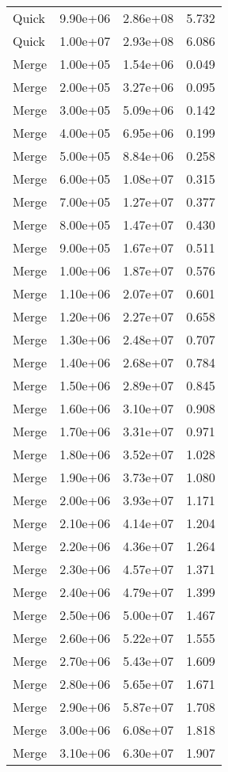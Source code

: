 \begin{table}
\begin{tabular}{llll}
Quick & 9.90e+06 & 2.86e+08 & 5.732 \\
Quick & 1.00e+07 & 2.93e+08 & 6.086 \\
Merge & 1.00e+05 & 1.54e+06 & 0.049 \\
Merge & 2.00e+05 & 3.27e+06 & 0.095 \\
Merge & 3.00e+05 & 5.09e+06 & 0.142 \\
Merge & 4.00e+05 & 6.95e+06 & 0.199 \\
Merge & 5.00e+05 & 8.84e+06 & 0.258 \\
Merge & 6.00e+05 & 1.08e+07 & 0.315 \\
Merge & 7.00e+05 & 1.27e+07 & 0.377 \\
Merge & 8.00e+05 & 1.47e+07 & 0.430 \\
Merge & 9.00e+05 & 1.67e+07 & 0.511 \\
Merge & 1.00e+06 & 1.87e+07 & 0.576 \\
Merge & 1.10e+06 & 2.07e+07 & 0.601 \\
Merge & 1.20e+06 & 2.27e+07 & 0.658 \\
Merge & 1.30e+06 & 2.48e+07 & 0.707 \\
Merge & 1.40e+06 & 2.68e+07 & 0.784 \\
Merge & 1.50e+06 & 2.89e+07 & 0.845 \\
Merge & 1.60e+06 & 3.10e+07 & 0.908 \\
Merge & 1.70e+06 & 3.31e+07 & 0.971 \\
Merge & 1.80e+06 & 3.52e+07 & 1.028 \\
Merge & 1.90e+06 & 3.73e+07 & 1.080 \\
Merge & 2.00e+06 & 3.93e+07 & 1.171 \\
Merge & 2.10e+06 & 4.14e+07 & 1.204 \\
Merge & 2.20e+06 & 4.36e+07 & 1.264 \\
Merge & 2.30e+06 & 4.57e+07 & 1.371 \\
Merge & 2.40e+06 & 4.79e+07 & 1.399 \\
Merge & 2.50e+06 & 5.00e+07 & 1.467 \\
Merge & 2.60e+06 & 5.22e+07 & 1.555 \\
Merge & 2.70e+06 & 5.43e+07 & 1.609 \\
Merge & 2.80e+06 & 5.65e+07 & 1.671 \\
Merge & 2.90e+06 & 5.87e+07 & 1.708 \\
Merge & 3.00e+06 & 6.08e+07 & 1.818 \\
Merge & 3.10e+06 & 6.30e+07 & 1.907 \\

\end{tabular}
\end{table}

